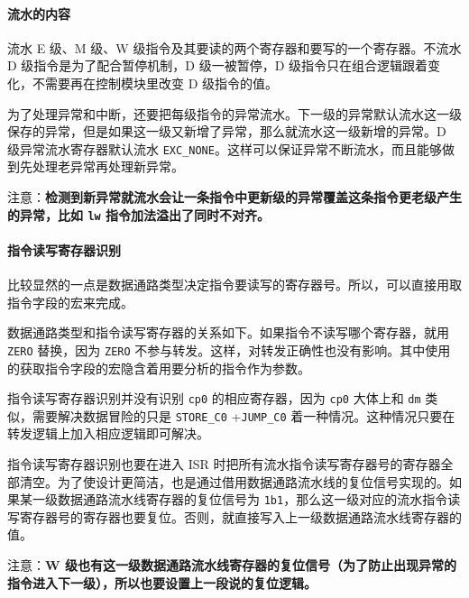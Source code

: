 \documentclass[12pt,AutoFakeBold,AutoFakeSlant]{article}
\begin{document}
\hypertarget{ux6d41ux6c34ux7684ux5185ux5bb9}{%
\paragraph{流水的内容}\label{ux6d41ux6c34ux7684ux5185ux5bb9}}

流水 E 级、M 级、W 级指令及其要读的两个寄存器和要写的一个寄存器。不流水
D 级指令是为了配合暂停机制，D 级一被暂停，D
级指令只在组合逻辑跟着变化，不需要再在控制模块里改变 D 级指令的值。

为了处理异常和中断，还要把每级指令的异常流水。下一级的异常默认流水这一级保存的异常，但是如果这一级又新增了异常，那么就流水这一级新增的异常。D
级异常流水寄存器默认流水
\texttt{EXC\_NONE}。这样可以保证异常不断流水，而且能够做到先处理老异常再处理新异常。

注意：\textbf{检测到新异常就流水会让一条指令中更新级的异常覆盖这条指令更老级产生的异常，比如
\texttt{lw} 指令加法溢出了同时不对齐。}

\hypertarget{ux6307ux4ee4ux8bfbux5199ux5bc4ux5b58ux5668ux8bc6ux522b}{%
\paragraph{指令读写寄存器识别}\label{ux6307ux4ee4ux8bfbux5199ux5bc4ux5b58ux5668ux8bc6ux522b}}

比较显然的一点是数据通路类型决定指令要读写的寄存器号。所以，可以直接用取指令字段的宏来完成。

数据通路类型和指令读写寄存器的关系如下。如果指令不读写哪个寄存器，就用
\texttt{ZERO} 替换，因为 \texttt{ZERO}
不参与转发。这样，对转发正确性也没有影响。其中使用的获取指令字段的宏隐含着用要分析的指令作为参数。

指令读写寄存器识别并没有识别 \texttt{cp0} 的相应寄存器，因为
\texttt{cp0} 大体上和 \texttt{dm} 类似，需要解决数据冒险的只是
\texttt{STORE\_C0} +\texttt{JUMP\_C0}
着一种情况。这种情况只要在转发逻辑上加入相应逻辑即可解决。

指令读写寄存器识别也要在进入 ISR
时把所有流水指令读写寄存器号的寄存器全部清空。为了使设计更简洁，也是通过借用数据通路流水线的复位信号实现的。如果某一级数据通路流水线寄存器的复位信号为
\texttt{1\textquotesingle{}b1}，那么这一级对应的流水指令读写寄存器号的寄存器也要复位。否则，就直接写入上一级数据通路流水线寄存器的值。

注意：\textbf{W
级也有这一级数据通路流水线寄存器的复位信号（为了防止出现异常的指令进入下一级），所以也要设置上一段说的复位逻辑。}
\end{document}
